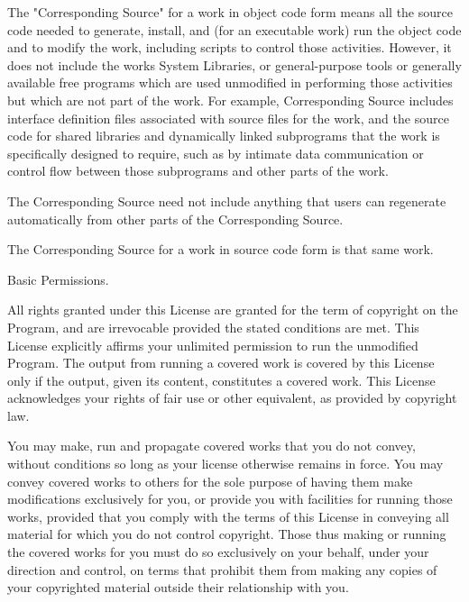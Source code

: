 The "{}\+Corresponding Source"{} for a work in object code form means all the source code needed to generate, install, and (for an executable work) run the object code and to modify the work, including scripts to control those activities. However, it does not include the work\textquotesingle{}s System Libraries, or general-\/purpose tools or generally available free programs which are used unmodified in performing those activities but which are not part of the work. For example, Corresponding Source includes interface definition files associated with source files for the work, and the source code for shared libraries and dynamically linked subprograms that the work is specifically designed to require, such as by intimate data communication or control flow between those subprograms and other parts of the work.

The Corresponding Source need not include anything that users can regenerate automatically from other parts of the Corresponding Source.

The Corresponding Source for a work in source code form is that same work.


\begin{DoxyEnumerate}
\item Basic Permissions.
\end{DoxyEnumerate}

All rights granted under this License are granted for the term of copyright on the Program, and are irrevocable provided the stated conditions are met. This License explicitly affirms your unlimited permission to run the unmodified Program. The output from running a covered work is covered by this License only if the output, given its content, constitutes a covered work. This License acknowledges your rights of fair use or other equivalent, as provided by copyright law.

You may make, run and propagate covered works that you do not convey, without conditions so long as your license otherwise remains in force. You may convey covered works to others for the sole purpose of having them make modifications exclusively for you, or provide you with facilities for running those works, provided that you comply with the terms of this License in conveying all material for which you do not control copyright. Those thus making or running the covered works for you must do so exclusively on your behalf, under your direction and control, on terms that prohibit them from making any copies of your copyrighted material outside their relationship with you.


